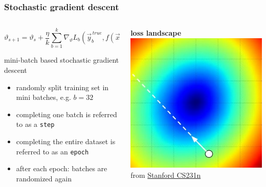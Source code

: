 \documentclass[
  aspectratio=1610, %
  intlimits %
]{beamer}
\renewcommand\footnotesize{\tiny}
\begin{document}
 \begin{frame}
   \frametitle{Stochastic gradient descent}
   \vspace{-1em}
\begin{columns}
  \begin{column}{.475\textwidth}
    \begin{equation*}
\vartheta_{s+1} = \vartheta_{s} + \frac{\eta}{k} \sum_{b=1}^{k} \nabla_{\vartheta}L_b( \vec{y}^{\,true}_b, f(\vec{x}_b, \vartheta_{s}))
\end{equation*}

\begin{block}{mini-batch based stochastic gradient descent}

  \begin{itemize}
  \item randomly split training set in mini batches, e.g. $b=32$
  \item completing one batch is referred to as a \texttt{step}
  \item completing the entire dataset is referred to as an \texttt{epoch}
  \item after each epoch: batches are randomized again
  \end{itemize}
\end{block}
\end{column}

\begin{column}{.475\textwidth}
  \centering
  \textbf{loss landscape}
  \footnotesize
  \includegraphics[width=.9\textwidth]{figures/stepsize}\\
  from \href{https://cs231n.github.io/optimization-1/}{Stanford CS231n}
  \end{column}
\end{columns}
\end{frame}
\end{document}
